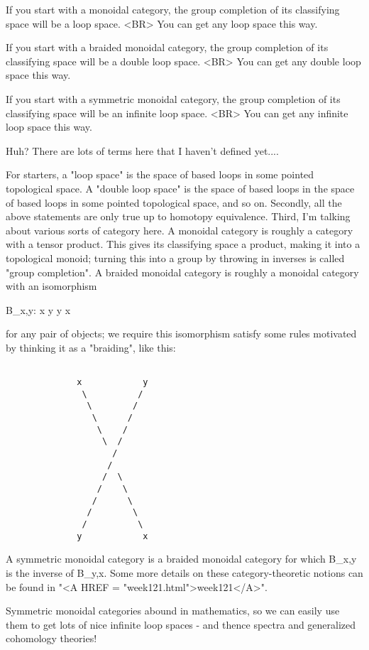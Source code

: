 If you start with a monoidal category, the group completion of 
its classifying space will be a loop space.  <BR>
You can get any loop space this way.

If you start with a braided monoidal category, the group completion of 
its classifying space will be a double loop space.  <BR>
You can get any double loop space this way.

If you start with a symmetric monoidal category, the group completion of
its classifying space will be an infinite loop space.  <BR>
You can get any infinite loop space this way.

Huh?  There are lots of terms here that I haven't defined yet....

For starters, a "loop space" is the space of based loops in some
pointed topological space.  A "double loop space" is the space of
based loops in the space of based loops in some pointed topological
space, and so on.  Secondly, all the above statements are only true up
to homotopy equivalence.  Third, I'm talking about various sorts of
category here.  A monoidal category is roughly a category with a
tensor product.  This gives its classifying space a product, making it
into a topological monoid; turning this into a group by throwing in
inverses is called "group completion".  A braided monoidal category is
roughly a monoidal category with an isomorphism

B_{x,y}: x \otimes  y \to  y \otimes  x

for any pair of objects; we require this isomorphism satisfy some rules 
motivated by thinking it as a "braiding", like this:


\begin{verbatim}

              x            y
               \          /
                \        /
                 \      /
                  \    /
                   \  /
                     /
                    /
                   /  \
                  /    \
                 /      \
                /        \
               /          \
              y            x
\end{verbatim}
    
A symmetric monoidal category is a braided monoidal category for which
B_{x,y} is the inverse of B_{y,x}.  Some more details
on these category-theoretic notions can be found in "<A HREF =
"week121.html">week121</A>".

Symmetric monoidal categories abound in mathematics, so we can easily use 
them to get lots of nice infinite loop spaces - and thence spectra and 
generalized cohomology theories!


